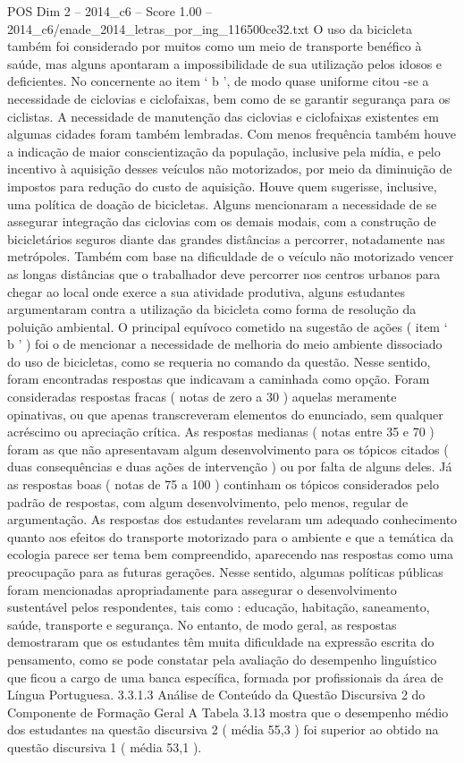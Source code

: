 \begin{textsample}{POS Dim 2 – 2014\_c6 – Score 1.00 – 2014\_c6/enade\_2014\_letras\_por\_ing\_116500ce32.txt}
O uso da bicicleta também foi considerado por muitos como um meio de transporte benéfico à saúde, mas alguns apontaram a impossibilidade de sua utilização pelos idosos e deficientes.
No concernente ao item ‘ b ’, de modo quase uniforme citou -se a necessidade de ciclovias e ciclofaixas, bem como de se garantir segurança para os ciclistas.
A necessidade de manutenção das ciclovias e ciclofaixas existentes em algumas cidades foram também lembradas.
Com menos frequência também houve a indicação de maior conscientização da população, inclusive pela mídia, e pelo incentivo à aquisição desses veículos não motorizados, por meio da diminuição de impostos para redução do custo de aquisição.
Houve quem sugerisse, inclusive, uma política de doação de bicicletas.
Alguns mencionaram a necessidade de se assegurar integração das ciclovias com os demais modais, com a construção de bicicletários seguros diante das grandes distâncias a percorrer, notadamente nas metrópoles.
Também com base na dificuldade de o veículo não motorizado vencer as longas distâncias que o trabalhador deve percorrer nos centros urbanos para chegar ao local onde exerce a sua atividade produtiva, alguns estudantes argumentaram contra a utilização da bicicleta como forma de resolução da poluição ambiental.
O principal equívoco cometido na sugestão de ações ( item ‘ b ’ ) foi o de mencionar a necessidade de melhoria do meio ambiente dissociado do uso de bicicletas, como se requeria no comando da questão.
Nesse sentido, foram encontradas respostas que indicavam a caminhada como opção.
Foram consideradas respostas fracas ( notas de zero a 30 ) aquelas meramente opinativas, ou que apenas transcreveram elementos do enunciado, sem qualquer acréscimo ou apreciação crítica.
As respostas medianas ( notas entre 35 e 70 ) foram as que não apresentavam algum desenvolvimento para os tópicos citados ( duas consequências e duas ações de intervenção ) ou por falta de alguns deles.
Já as respostas boas ( notas de 75 a 100 ) continham os tópicos considerados pelo padrão de respostas, com algum desenvolvimento, pelo menos, regular de argumentação.
As respostas dos estudantes revelaram um adequado conhecimento quanto aos efeitos do transporte motorizado para o ambiente e que a temática da ecologia parece ser tema bem compreendido, aparecendo nas respostas como uma preocupação para as futuras gerações.
Nesse sentido, algumas políticas públicas foram mencionadas apropriadamente para assegurar o desenvolvimento sustentável pelos respondentes, tais como : educação, habitação, saneamento, saúde, transporte e segurança.
No entanto, de modo geral, as respostas demostraram que os estudantes têm muita dificuldade na expressão escrita do pensamento, como se pode constatar pela avaliação do desempenho linguístico que ficou a cargo de uma banca específica, formada por profissionais da área de Língua Portuguesa. 3.3.1.3 Análise de Conteúdo da Questão Discursiva 2 do Componente de Formação Geral A Tabela 3.13 mostra que o desempenho médio dos estudantes na questão discursiva 2 ( média 55,3 ) foi superior ao obtido na questão discursiva 1 ( média 53,1 ).

\end{textsample}
